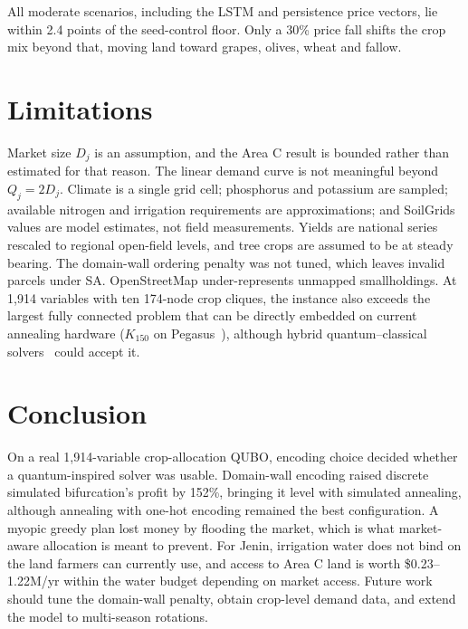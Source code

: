 \documentclass[conference,a4paper]{IEEEtran}
\begin{document}
All moderate scenarios, including the LSTM and persistence price vectors,
lie within 2.4 points of the seed-control floor. Only a 30\% price fall shifts the crop mix
beyond that, moving land toward grapes, olives, wheat and fallow.

\section{Limitations}

Market size $D_j$ is an assumption, and the Area C result is bounded rather
than estimated for that reason. The linear demand curve is not meaningful
beyond $Q_j=2D_j$. Climate is a single grid cell; phosphorus and potassium are
sampled; available nitrogen and irrigation requirements are approximations;
and SoilGrids values are model estimates, not field measurements. Yields are
national series rescaled to regional open-field levels, and tree crops are
assumed to be at steady bearing. The domain-wall ordering penalty was not
tuned, which leaves invalid parcels under SA. OpenStreetMap under-represents
unmapped smallholdings. At 1{,}914 variables with ten 174-node crop cliques,
the instance also exceeds the largest fully connected problem that can be
directly embedded on current annealing hardware ($K_{150}$ on
Pegasus~\cite{dwaveembed}), although hybrid quantum--classical
solvers~\cite{kim2025} could accept it.

\section{Conclusion}

On a real 1{,}914-variable crop-allocation QUBO, encoding choice decided
whether a quantum-inspired solver was usable. Domain-wall encoding raised
discrete simulated bifurcation's profit by 152\%, bringing it level with
simulated annealing, although annealing with one-hot encoding remained the
best configuration. A myopic greedy plan lost money by flooding the market,
which is what market-aware allocation is meant to prevent. For Jenin,
irrigation water does not bind on the land farmers can currently use, and
access to Area C land is worth \$0.23--1.22M/yr within the water budget
depending on market access. Future work should tune the domain-wall penalty,
obtain crop-level demand data, and extend the model to multi-season rotations.



\end{document}
